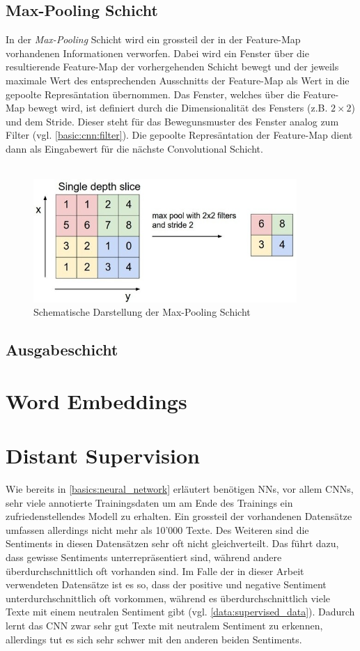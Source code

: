 \subsection{Max-Pooling Schicht}
\label{basic:cnn:pooling}
In der \emph{Max-Pooling} Schicht wird ein grossteil der in der Feature-Map vorhandenen Informationen verworfen. Dabei wird ein Fenster über die resultierende Feature-Map der vorhergehenden Schicht bewegt und der jeweils maximale Wert des entsprechenden Ausschnitts der Feature-Map als Wert in die gepoolte Represäntation übernommen. Das Fenster, welches über die Feature-Map bewegt wird, ist definiert durch die Dimensionalität des Fensters (z.B. $2\times 2$) und dem Stride. Dieser steht für das Bewegunsmuster des Fenster analog zum Filter (vgl. \ref{basic:cnn:filter}). Die gepoolte Represäntation der Feature-Map dient dann als Eingabewert für die nächste Convolutional Schicht.\\\\

\begin{figure}[h]
	\centering
	\includegraphics[width=10cm]{img/max_pooling}
	\caption{Schematische Darstellung der Max-Pooling Schicht}
\end{figure}

\subsection{Ausgabeschicht}
\blindtext
\section{Word Embeddings}
\blindtext
\section{Distant Supervision}
Wie bereits in \ref{basics:neural_network} erläutert benötigen NNs, vor allem CNNs, sehr viele annotierte Trainingsdaten  um am Ende des Trainings ein zufriedenstellendes Modell zu erhalten. Ein grossteil der vorhandenen Datensätze umfassen allerdings nicht mehr als 10'000 Texte. Des Weiteren sind die Sentiments in diesen Datensätzen sehr oft nicht gleichverteilt. Das führt dazu, dass gewisse Sentiments unterrepräsentiert sind, während andere überdurchschnittlich oft vorhanden sind. Im Falle der in dieser Arbeit verwendeten Datensätze ist es so, dass der positive und negative Sentiment unterdurchschnittlich oft vorkommen, während es überdurchschnittlich viele Texte mit einem neutralen Sentiment gibt (vgl. \ref{data:supervised_data}). Dadurch lernt das CNN zwar sehr gut Texte mit neutralem Sentiment zu erkennen, allerdings tut es sich sehr schwer mit den anderen beiden Sentiments.

